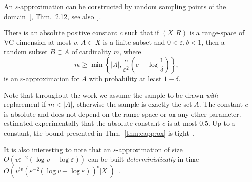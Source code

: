 %
An $\varepsilon$-approximation can be constructed by random sampling points of
the domain~[\citealp{HarPS11}, Thm.~2.12, see also~\citep{LiLS01}].

\begin{theorem}\label{thm:eapprox}
  There is an absolute positive constant $c$
  such that if $(X,R)$ is a range-space of VC-dimension at most $v$, $A\subset
  X$ is a finite subset and $0<\varepsilon,\delta<1$, then a
  random subset $B\subset A$ of cardinality $m$, where
  \begin{equation}\label{eq:eapprox}
    m\ge\min\left\{|A|,\frac{c}{\varepsilon^2}\left(v+\log\frac{1}{\delta}\right)\right\},
  \end{equation}
  is an $\varepsilon$-approximation for $A$ with probability at least $1-\delta$.
\end{theorem}

Note that throughout the work we assume the sample to be drawn \emph{with}
replacement if $m<|A|$, otherwise the sample is exactly the set $A$. The
constant $c$ is absolute and does not depend on the range space or on
any other parameter. \citet{LofflerP09} %
estimated experimentally that the absolute constant $c$ is at most $0.5$. Up to
a constant, the bound presented in Thm.~\ref{thm:eapprox} is tight~\citep[Thm.~5]{LiLS01}. 

It is also interesting to note that an $\varepsilon$-approximation of size
$O(v\varepsilon^{-2}(\log v-\log\varepsilon))$ can be built
\emph{deterministically} in time
$O(v^{3v}(\varepsilon^{-2}(\log v-\log\varepsilon))^v|X|)$~\citep{Chazelle00}.

